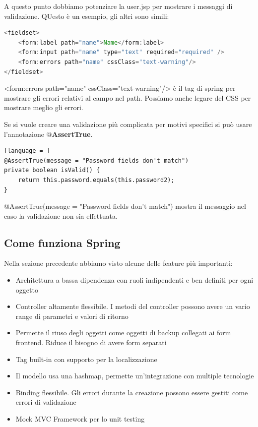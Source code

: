 \documentclass[11pt,a4paper]{book}
\begin{document}
A questo punto dobbiamo potenziare la user.jsp per mostrare i messaggi di validazione. QUesto è un esempio, gli altri sono simili:
\begin{lstlisting}[language = Java]
<fieldset>
	<form:label path="name">Name</form:label>
	<form:input path="name" type="text" required="required" />
	<form:errors path="name" cssClass="text-warning"/>
</fieldset>
\end{lstlisting}

<form:errors path="name" cssClass="text-warning"/> è il tag di spring per mostrare gli errori relativi al campo nel path. Possiamo anche legare del CSS per mostrare meglio gli errori.

Se si vuole creare una validazione più complicata per motivi specifici si può usare l'annotazione \textbf{$@$AssertTrue}.
\begin{lstlisting}[language = ]
@AssertTrue(message = "Password fields don't match")
private boolean isValid() {
	return this.password.equals(this.password2);
}
\end{lstlisting}
$@$AssertTrue(message = "Password fields don't match") mostra il messaggio nel caso la validazione non sia effettuata.


\subsection{Come funziona Spring}
Nella sezione precedente abbiamo visto alcune delle feature più importanti:
\begin{itemize}
	\item Architettura a bassa dipendenza con ruoli indipendenti e ben definiti per ogni oggetto
	\item Controller altamente flessibile. I metodi del controller possono avere un vario range di parametri e valori di ritorno
	\item Permette il riuso degli oggetti come oggetti di backup collegati ai form frontend. Riduce il bisogno di avere form separati
	\item Tag built-in con supporto per la localizzazione
	\item Il modello usa una hashmap, permette un'integrazione con multiple tecnologie
	\item Binding flessibile. Gli errori durante la creazione possono essere gestiti come errori di validazione
	\item Mock MVC Framework per lo unit testing
\end{itemize}
\end{document}

